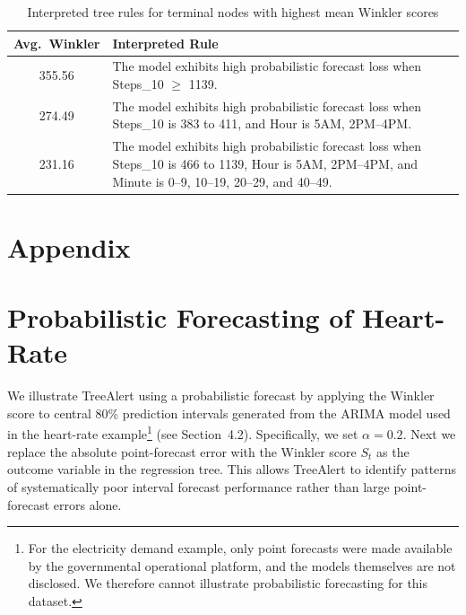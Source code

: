 \documentclass[]{interact}
\newcommand{\spacingset}[1]{}
\theoremstyle{definition}
\begin{document}
{\spacingset{1.6}
\FloatBarrier


}



\begingroup
\setcounter{table}{0}
\renewcommand{\thetable}{A\arabic{table}}
\begin{table}
\centering
\caption{Interpreted tree rules for terminal nodes with highest mean Winkler scores}
\label{tab:winkler_rules}
\small
\begin{tabular}{c p{12.5cm}}
\hline
\textbf{Avg.~Winkler} & \textbf{Interpreted Rule} \\
\hline
355.56 & The model exhibits high probabilistic forecast loss when Steps\_10 $\geq$ 1139. \\
274.49 & The model exhibits high probabilistic forecast loss when Steps\_10 is 383 to 411, and Hour is 5AM, 2PM--4PM. \\
231.16 & The model exhibits high probabilistic forecast loss when Steps\_10 is 466 to 1139, Hour is 5AM, 2PM--4PM, and Minute is 0--9, 10--19, 20--29, and 40--49. \\
\hline
\end{tabular}
\end{table}
\endgroup
\FloatBarrier
\appendix
\section*{Appendix}

\section{Probabilistic Forecasting of Heart-Rate}
\label{probabilistic_treealert}

We illustrate TreeAlert using a probabilistic forecast by applying the Winkler score to central 80\% prediction intervals generated from the ARIMA model used in the heart-rate example\footnote{For the electricity demand example, only point forecasts were made available by the governmental operational platform, and the models themselves are not disclosed. We therefore cannot illustrate probabilistic forecasting for this dataset.} (see Section~4.2). Specifically, we set $\alpha=0.2$. Next we replace the absolute point-forecast error with the Winkler score $S_t$ as the outcome variable in the regression tree. This allows TreeAlert to identify patterns of systematically poor interval forecast performance rather than large point-forecast errors alone.
\end{document}
